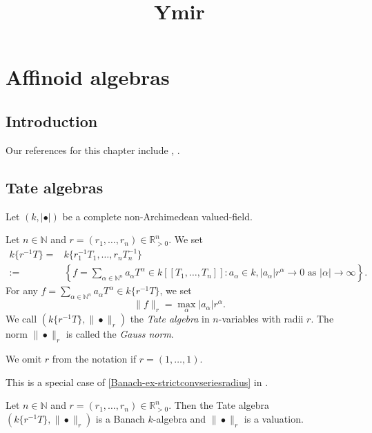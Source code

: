 
\title{Ymir}

\maketitle
\tableofcontents


\chapter*{Affinoid algebras}\label{chap-affinoid}

\section{Introduction}\label{sec-introduction}
Our references  for this chapter include \cite{BGR}, \cite{Berk12}.
\section{Tate algebras}
Let $(k,|\bullet|)$ be a complete non-Archimedean valued-field. 

\begin{definition}
    Let $n\in \mathbb{N}$ and $r=(r_1,\ldots,r_n)\in \mathbb{R}^n_{>0}$. We set 
    \[
        \begin{split}
        k\{r^{-1}T\}=& k\{r_1^{-1}T_1,\ldots,r_n T_n^{-1}\} \\
        :=&\left\{f=\sum_{\alpha\in \mathbb{N}^n} a_{\alpha}T^{\alpha}\in k[[T_1,\ldots,T_n]]:a_{\alpha}\in k, |a_{\alpha}|r^{\alpha}\to 0\text{ as }|\alpha|\to\infty \right\}.
        \end{split}
    \]
    For any $f=\sum_{\alpha\in \mathbb{N}^n} a_{\alpha}T^{\alpha}\in k\{r^{-1}T\}$, we set
    \[
        \|f\|_r=\max_{\alpha}|a_{\alpha}|r^{\alpha}.  
    \]
    We call $(k\{r^{-1}T\},\|\bullet\|_r)$ the \emph{Tate algebra} in $n$-variables with radii $r$. The norm $\|\bullet\|_r$ is called the \emph{Gauss norm}.

    We omit $r$ from the notation if $r=(1,\ldots,1)$.
\end{definition}
This is a special case of \cref{Banach-ex-strictconvseriesradius}  in .
\begin{proposition}\label{prop-TateGaussvaluation}
    Let $n\in \mathbb{N}$ and $r=(r_1,\ldots,r_n)\in \mathbb{R}^n_{>0}$.  Then the Tate algebra $(k\{r^{-1}T\},\|\bullet\|_r)$ is a Banach $k$-algebra and $\|\bullet\|_r$ is a valuation.
\end{proposition}

